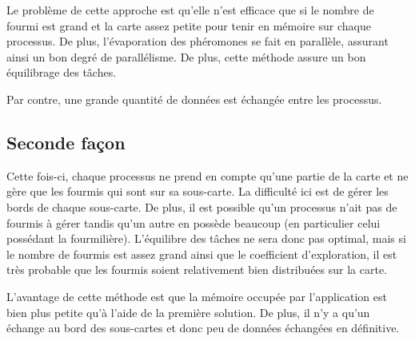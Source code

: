 \documentclass[a4]{article}
\begin{document}
Le problème de cette approche est qu'elle n'est efficace que si le nombre de fourmi est grand et la carte assez petite pour tenir en mémoire sur chaque processus. De plus, l'évaporation des phéromones se fait en parallèle, assurant ainsi un bon degré de parallélisme. De plus, cette méthode assure un bon équilibrage des tâches.

Par contre, une grande quantité de données est échangée entre les processus.

\subsection{Seconde façon}

Cette fois-ci, chaque processus ne prend en compte qu'une partie de la carte et ne gère que les fourmis qui sont sur sa sous-carte. La difficulté ici est de gérer les bords de chaque sous-carte. De plus, il est possible qu'un processus n'ait pas de fourmis à gérer tandis qu'un autre en possède beaucoup (en particulier celui possédant la fourmilière). L'équilibre des tâches ne sera donc pas optimal, mais si le nombre de fourmis est assez grand ainsi que le coefficient d'exploration, il est très probable que les fourmis soient relativement bien distribuées sur la carte.

L'avantage de cette méthode est que la mémoire occupée par l'application est bien plus petite qu'à l'aide de la première solution. De plus,
il n'y a qu'un échange au bord des sous-cartes et donc peu de données échangées en définitive.
\end{document}
